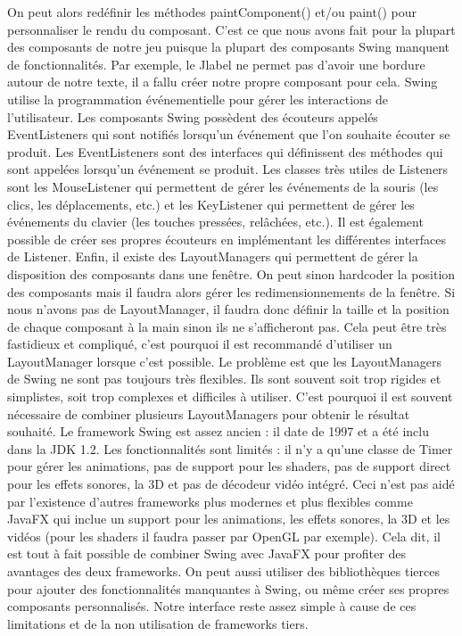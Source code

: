 \documentclass{article}
\begin{document}
    On peut alors redéfinir les méthodes paintComponent() et/ou paint() pour personnaliser le rendu du composant.
    C'est ce que nous avons fait pour la plupart des composants de notre jeu puisque la plupart des composants Swing manquent de fonctionnalités.
    Par exemple, le Jlabel ne permet pas d'avoir une bordure autour de notre texte, il a fallu créer notre propre composant pour cela.
    \newline
    Swing utilise la programmation événementielle pour gérer les interactions de l'utilisateur.
    Les composants Swing possèdent des écouteurs appelés EventListeners qui sont notifiés lorsqu'un événement que l'on souhaite écouter se produit.
    Les EventListeners sont des interfaces qui définissent des méthodes qui sont appelées lorsqu'un événement se produit.
    Les classes très utiles de Listeners sont les MouseListener qui permettent de gérer les événements de la souris (les clics, les déplacements, etc.) et les KeyListener qui permettent de gérer les événements du clavier (les touches pressées, relâchées, etc.).
    Il est également possible de créer ses propres écouteurs en implémentant les différentes interfaces de Listener.
    \newline
    Enfin, il existe des LayoutManagers qui permettent de gérer la disposition des composants dans une fenêtre.
    On peut sinon hardcoder la position des composants mais il faudra alors gérer les redimensionnements de la fenêtre.
    Si nous n'avons pas de LayoutManager, il faudra donc définir la taille et la position de chaque composant à la main sinon ils ne s'afficheront pas.
    Cela peut être très fastidieux et compliqué, c'est pourquoi il est recommandé d'utiliser un LayoutManager lorsque c'est possible.
    Le problème est que les LayoutManagers de Swing ne sont pas toujours très flexibles.
    Ils sont souvent soit trop rigides et simplistes, soit trop complexes et difficiles à utiliser.
    C'est pourquoi il est souvent nécessaire de combiner plusieurs LayoutManagers pour obtenir le résultat souhaité.
    \newline
    Le framework Swing est assez ancien : il date de 1997 et a été inclu dans la JDK 1.2.
    Les fonctionnalités sont limités : il n'y a qu'une classe de Timer pour gérer les animations, pas de support pour les shaders, pas de support direct pour les effets sonores, la 3D et pas de décodeur vidéo intégré.
    Ceci n'est pas aidé par l'existence d'autres frameworks plus modernes et plus flexibles comme JavaFX qui inclue un support pour les animations, les effets sonores, la 3D et les vidéos (pour les shaders il faudra passer par OpenGL par exemple).
    Cela dit, il est tout à fait possible de combiner Swing avec JavaFX pour profiter des avantages des deux frameworks.
    On peut aussi utiliser des bibliothèques tierces pour ajouter des fonctionnalités manquantes à Swing, ou même créer ses propres composants personnalisés.
    Notre interface reste assez simple à cause de ces limitations et de la non utilisation de frameworks tiers.
\end{document}
